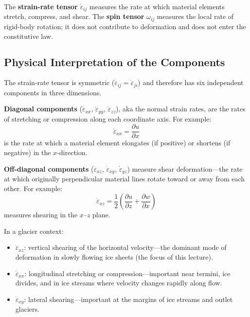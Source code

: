 \documentclass[11pt]{article}
\begin{document}
\noindent The \textbf{strain-rate tensor} $\dot{\varepsilon}_{ij}$ measures the rate at which material elements stretch, compress, and shear.  The \textbf{spin tensor} $\omega_{ij}$ measures the local rate of rigid-body rotation; it does not contribute to deformation and does not enter the constitutive law.

\subsection{Physical Interpretation of the Components}

The strain-rate tensor is symmetric ($\dot{\varepsilon}_{ij} = \dot{\varepsilon}_{ji}$) and therefore has six independent components in three dimensions.

\medskip
\noindent\textbf{Diagonal components} ($\dot{\varepsilon}_{xx}$, $\dot{\varepsilon}_{yy}$, $\dot{\varepsilon}_{zz}$), aka the normal strain rates, are the rates of stretching or compression along each coordinate axis.  For example:
\begin{equation}
  \dot{\varepsilon}_{xx} = \frac{\partial u}{\partial x}
\end{equation}
is the rate at which a material element elongates (if positive) or shortens (if negative) in the $x$-direction.

\medskip
\noindent\textbf{Off-diagonal components} ($\dot{\varepsilon}_{xz}$, $\dot{\varepsilon}_{xy}$, $\dot{\varepsilon}_{yz}$) measure shear deformation---the rate at which originally perpendicular material lines rotate toward or away from each other.  For example:
\begin{equation}
  \dot{\varepsilon}_{xz} = \frac{1}{2}\!\left(\frac{\partial u}{\partial z} + \frac{\partial w}{\partial x}\right)
\end{equation}
measures shearing in the $x$--$z$ plane.


\medskip
\noindent In a glacier context:
\begin{itemize}
  \item $\dot{\varepsilon}_{xz}$: vertical shearing of the horizontal velocity---the dominant mode of deformation in slowly flowing ice sheets (the focus of this lecture).
  \item $\dot{\varepsilon}_{xx}$: longitudinal stretching or compression---important near termini, ice divides, and in ice streams where velocity changes rapidly along flow.
  \item $\dot{\varepsilon}_{xy}$: lateral shearing---important at the margins of ice streams and outlet glaciers.
\end{itemize}
\end{document}
